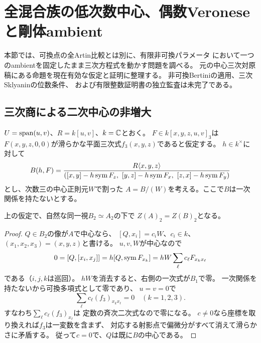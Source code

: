\section{全混合族の低次数中心、偶数Veroneseと剛体ambient}
\label{sec:moduli-rigid-ambient}
本節では、可換点の全Artin比較とは別に、有限非可換パラメータ
において一つのambientを固定したまま三次方程式を動かす問題を調べる。
元の中心三次対原稿にある命題を現在有効な仮定と証明に整理する。
非可換Bertiniの適用、三次Sklyaninの位数条件、
および有限整数証明書の独立監査は未完了である。

\subsection{三次商による二次中心の非増大}
$U=\operatorname{span}(u,v)$、$R=k[u,v]$、$k=\mathbb C$とおく。
$F\in k[x,y,z,u,v]_3$は
$F(x,y,z,0,0)$が滑らかな平面三次式$f_3(x,y,z)$であると仮定する。
$h\in k^\times$に対して
\[
 B(h,F)=\frac{R\langle x,y,z\rangle}
 {([x,y]-h\operatorname{sym} F_z,\ [y,z]-h\operatorname{sym} F_x,\
    [z,x]-h\operatorname{sym} F_y)}
\]
とし、次数三の中心正則元$W$で割った
$A=B/(W)$を考える。ここで$B$は一次関係を持たないとする。

\begin{lemma}[中心三次商では二次中心が増えない]
\label{lem:moduli-no-new-quadratic-center}
上の仮定で、自然な同一視$B_2\simeq A_2$の下で
$Z(A)_2=Z(B)_2$となる。
\end{lemma}
\begin{proof}
$Q\in B_2$の像が$A$で中心なら、
$[Q,x_i]=c_iW$、$c_i\in k$、
$(x_1,x_2,x_3)=(x,y,z)$と書ける。
$u,v,W$が中心なので
\[
 0=[Q,[x_i,x_j]]
 =h[Q,\operatorname{sym} F_{x_k}]
 =hW\sum_\ell c_\ell F_{x_kx_\ell}
\]
である（$i,j,k$は巡回）。
$hW$を消去すると、右側の一次式が$B_1$で零。
一次関係を持たないから可換多項式として零であり、
$u=v=0$で
\[
  \sum_\ell c_\ell(f_3)_{x_kx_\ell}=0
  \quad(k=1,2,3).
\]
すなわち$\sum_\ell c_\ell(f_3)_{x_\ell}$は
定数の斉次二次式なので零になる。
$c\ne0$なら座標を取り換えれば$f_3$は一変数を含まず、
対応する射影点で偏微分がすべて消えて滑らかさに矛盾する。
従って$c=0$で、$Q$は既に$B$の中心である。
\end{proof}

